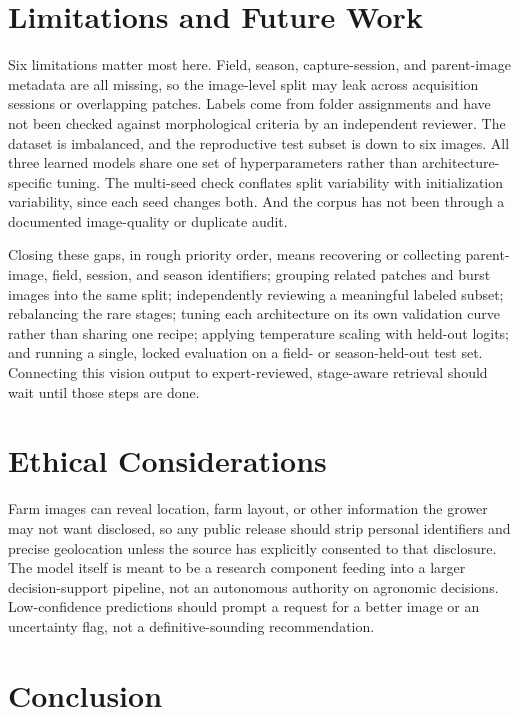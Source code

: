 \documentclass{llncs}
\begin{document}
\section{Limitations and Future Work}
\label{sec:limitations}

Six limitations matter most here. Field, season, capture-session, and parent-image metadata are all missing, so the image-level split may leak across acquisition sessions or overlapping patches. Labels come from folder assignments and have not been checked against morphological criteria by an independent reviewer. The dataset is imbalanced, and the reproductive test subset is down to six images. All three learned models share one set of hyperparameters rather than architecture-specific tuning. The multi-seed check conflates split variability with initialization variability, since each seed changes both. And the corpus has not been through a documented image-quality or duplicate audit.

Closing these gaps, in rough priority order, means recovering or collecting parent-image, field, session, and season identifiers; grouping related patches and burst images into the same split; independently reviewing a meaningful labeled subset; rebalancing the rare stages; tuning each architecture on its own validation curve rather than sharing one recipe; applying temperature scaling with held-out logits; and running a single, locked evaluation on a field- or season-held-out test set. Connecting this vision output to expert-reviewed, stage-aware retrieval should wait until those steps are done.

\section{Ethical Considerations}

Farm images can reveal location, farm layout, or other information the grower may not want disclosed, so any public release should strip personal identifiers and precise geolocation unless the source has explicitly consented to that disclosure. The model itself is meant to be a research component feeding into a larger decision-support pipeline, not an autonomous authority on agronomic decisions. Low-confidence predictions should prompt a request for a better image or an uncertainty flag, not a definitive-sounding recommendation.

\section{Conclusion}
\end{document}
